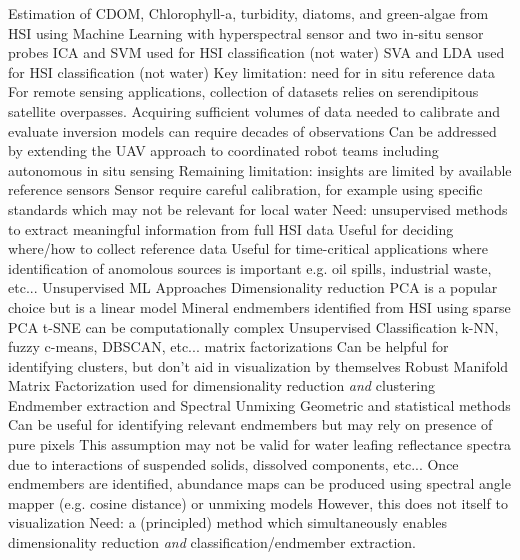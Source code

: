\documentclass{article}
\begin{document}
\begin{outline}[enumerate]
            \4 Estimation of CDOM, Chlorophyll-a, turbidity, diatoms, and green-algae from HSI using Machine Learning with hyperspectral sensor and two in-situ sensor probes \cite{keller2018hyperspectral}
            \4 ICA and SVM used for HSI classification (not water) \cite{liang2010hyperspectral}
            \4 SVA and LDA used for HSI classification (not water) \cite{zhangSVM2014}
    \2 Key limitation: need for in situ reference data
        \3 For remote sensing applications, collection of datasets relies on serendipitous satellite overpasses. Acquiring sufficient volumes of data needed to calibrate and evaluate inversion models can require decades of observations \cite{aurin2018remote,ross2019aquasat}
        \3 Can be addressed by extending the UAV approach to coordinated robot teams including autonomous in situ sensing \cite{robot-team-1, robot-team-2}
    \2 Remaining limitation: insights are limited by available reference sensors 
        \3 Sensor require careful calibration, for example using specific standards which may not be relevant for local water
    \2 Need: unsupervised methods to extract meaningful information from full HSI data
        \3 Useful for deciding where/how to collect reference data
        \3 Useful for time-critical applications where identification of anomolous sources is important e.g. oil spills, industrial waste, etc... 
\1 Unsupervised ML Approaches
    \2 Dimensionality reduction
        \3 PCA is a popular choice but is a linear model
            \4 Mineral endmembers identified from HSI using sparse PCA \cite{yousefi2016mineral}
        \3 t-SNE can be computationally complex 
    \2 Unsupervised Classification
        \3 k-NN, fuzzy c-means, DBSCAN, etc... matrix factorizations
        \3 Can be helpful for identifying clusters, but don't aid in visualization by themselves
            \4 Robust Manifold Matrix Factorization used for dimensionality reduction \textit{and} clustering \cite{zhang2019hyperspectral}
    \2 Endmember extraction and Spectral Unmixing
        \3 Geometric and statistical methods
        \3 Can be useful for identifying relevant endmembers but may rely on presence of pure pixels
            \4 This assumption may not be valid for water leafing reflectance spectra due to interactions of suspended solids, dissolved components, etc...
        \3 Once endmembers are identified, abundance maps can be produced using spectral angle mapper (e.g. cosine distance) or unmixing models
            \4 However, this does not itself to visualization
    \2 Need: a (principled) method which simultaneously enables dimensionality reduction \textit{and} classification/endmember extraction.

\end{outline}
\end{document}
